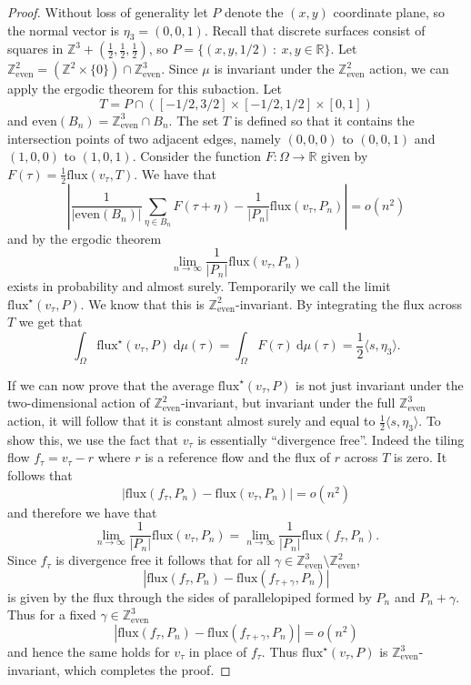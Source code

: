 \documentclass[11pt]{article}
\theoremstyle{remark}
\theoremstyle{definition}
\newcommand{\Z}{\mathbb{Z}}
\newcommand{\R}{\mathbb{R}}
\newcommand{\threeeven}{\Z^3_{\text{even}}}
\newcommand{\dd}{\mathrm{d}}
\begin{document}
\begin{proof}
Without loss of generality let $P$ denote the $(x,y)$ coordinate plane, so the normal vector is $\eta_3 =(0,0,1)$. Recall that discrete surfaces consist of squares in $\Z^3+(\frac{1}{2},\frac{1}{2},\frac{1}{2})$, so $P=\{(x,y,1/2)~:~x,y\in \R\}$. Let $\Z^2_{\text{even}}=(\Z^2\times\{0\})\cap \threeeven$. Since $\mu$ is invariant under the $\Z^2_{\text{even}}$ action, we can apply the ergodic theorem for this subaction. Let $$T=P\cap([-1/2,3/2]\times[-1/2,1/2]\times[0,1])$$ and $\text{even}(B_n)=\Z^3_{\text{even}}\cap B_n$. The set $T$ is defined so that it contains the intersection points of two adjacent edges, namely $(0,0,0)$ to $(0,0,1)$ and $(1,0,0)$ to $(1,0,1)$. Consider the function $F:\Omega\to \R$ given by $F(\tau)=\frac{1}{2}\text{flux}(v_{\tau},T)$. We have that
$$\left\vert\frac{1}{|\text{even}(B_n)|}\sum_{\eta\in B_n}F(\tau+\eta)-\frac{1}{|P_n|} \text{flux}(v_\tau,P_n)\right\vert=o(n^2)$$
and by the ergodic theorem 
$$\lim_{n\to \infty} \frac{1}{|P_n|} \text{flux}(v_\tau,P_n)$$
exists in probability and almost surely. Temporarily we call the limit $\text{flux}^\star(v_{\tau},P)$. We know that this is $\Z^2_{\text{even}}$-invariant. By integrating the flux across $T$ we get that 
$$\int_{\Omega}\text{flux}^\star(v_{\tau},P)\;\dd\mu(\tau)=\int_{\Omega}F(\tau)\:\dd\mu(\tau)=\frac{1}{2}\langle s,\eta_3\rangle.$$

If we can now prove that the average $\text{flux}^\star(v_{\tau},P)$ is not just invariant under the two-dimensional action of $\Z^2_{\text{even}}$-invariant, but invariant under the full $\threeeven$ action, it will follow that it is constant almost surely and equal to $\frac{1}{2}\langle s,\eta_3\rangle$. To show this, we use  the fact that $v_\tau$ is essentially ``divergence free''. Indeed the tiling flow $f_{\tau}=v_{\tau}-r$ where $r$ is a reference flow and the flux of $r$ across $T$ is zero. It follows that 
$$|\text{flux}(f_\tau,P_n) - \text{flux}(v_\tau,P_n)|=o(n^2)$$
and therefore we have that
$$\lim_{n\to \infty} \frac{1}{|P_n|} \text{flux}(v_\tau,P_n)=\lim_{n\to \infty} \frac{1}{|P_n|} \text{flux}(f_\tau,P_n).$$
Since $f_{\tau}$ is divergence free it follows that for all $\gamma\in \threeeven\setminus \Z^2_{\text{even}}$,
$$|\text{flux}(f_\tau,P_n)-\text{flux}(f_{\tau+\gamma},P_n)|$$
is given by the flux through the sides of parallelopiped formed by $P_n$ and $P_n+\gamma$. Thus for a fixed $\gamma\in \threeeven$
$$|\text{flux}(f_\tau,P_n)-\text{flux}(f_{\tau+\gamma},P_n)|=o(n^2)$$
and hence the same holds for $v_{\tau}$ in place of $f_{\tau}$. Thus $\text{flux}^\star(v_{\tau},P)$ is $\threeeven$-invariant, which completes the proof.
\end{proof}
\end{document}
